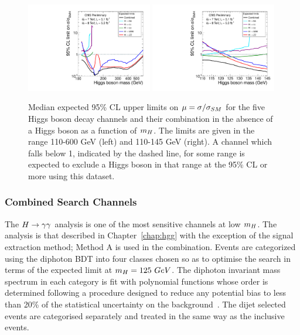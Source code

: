\begin{figure}
\begin{center}
	\includegraphics[width=0.49\textwidth]{combinations/ichep2012/Figure_001-a.pdf}
	\includegraphics[width=0.49\textwidth]{combinations/ichep2012/Figure_001-b.pdf}
	\caption{Median expected 95\% CL upper limits on $\mu=\sigma/\sigma_{SM}$ 
	for the five Higgs boson decay channels and their combination in the absence
	of a Higgs boson as a function of $m_{H}$. The limits are given in the range 
	110-600 GeV (left) and 110-145 GeV (right). A channel which falls below 1,
	indicated by the dashed line, for some range is expected to exclude a Higgs boson 
	in that range at the 95\% CL or more using this dataset.}
\end{center}
\label{fig:expectedlimits}
\end{figure}

\subsubsection{Combined Search Channels}
The $H\rightarrow\gamma\gamma$ analysis is one of the most sensitive channels at low $m_{H}$. The 
analysis is that described in Chapter~\ref{chap:hgg} with the exception of
the signal extraction method; Method A is used in the combination. Events are categorized using the diphoton BDT into 
four classes chosen so as to optimise the search in terms of the expected limit
at $m_{H}=125~GeV$. The diphoton invariant mass spectrum in each category is fit 
with polynomial functions whose order is determined following a procedure designed
to reduce any potential bias to less than 20\% of the statistical uncertainty on 
the background~\citep{HIG-12-015}. The dijet selected events are 
categorised separately and treated in the same way as the inclusive events.

